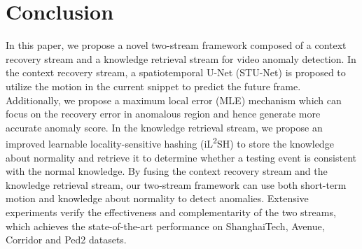 \documentclass[lettersize,journal]{IEEEtran}
\begin{document}
\section{Conclusion}
In this paper, we propose a novel two-stream framework composed of a context recovery stream and a knowledge retrieval stream for video anomaly detection.
In the context recovery stream, a spatiotemporal U-Net (STU-Net) is proposed to utilize the motion in the current snippet to predict the future frame.
Additionally, we propose a maximum local error (MLE) mechanism which can focus on the recovery error in anomalous region and hence generate more accurate anomaly score.
In the knowledge retrieval stream, we propose an improved learnable locality-sensitive hashing (iL\textsuperscript{2}SH) to store the knowledge about normality and retrieve it to determine whether a testing event is consistent with the normal knowledge.
By fusing the context recovery stream and the knowledge retrieval stream, our two-stream framework can use both short-term motion and knowledge about normality to detect anomalies.
Extensive experiments verify the effectiveness and complementarity of the two streams, which achieves the state-of-the-art performance on ShanghaiTech, Avenue, Corridor and Ped2 datasets.







\newpage
\end{document}
